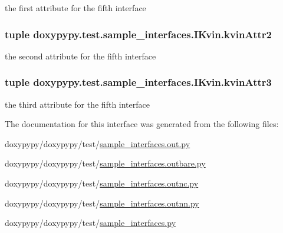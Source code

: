the first attribute for the fifth interface 

\hypertarget{classdoxypypy_1_1test_1_1sample__interfaces_1_1_i_kvin_ad630f62663e004b6abe8cb0e1ed1f73e}{
\subsubsection[{kvin\-Attr2}]{\setlength{\rightskip}{0pt plus 5cm}tuple doxypypy.\-test.\-sample\-\_\-interfaces.\-I\-Kvin.\-kvin\-Attr2\hspace{0.3cm}{\ttfamily [static]}}}\label{classdoxypypy_1_1test_1_1sample__interfaces_1_1_i_kvin_ad630f62663e004b6abe8cb0e1ed1f73e}


the second attribute for the fifth interface 

\hypertarget{classdoxypypy_1_1test_1_1sample__interfaces_1_1_i_kvin_ab17bfed438dd820f0216b1c29d717fc3}{
\subsubsection[{kvin\-Attr3}]{\setlength{\rightskip}{0pt plus 5cm}tuple doxypypy.\-test.\-sample\-\_\-interfaces.\-I\-Kvin.\-kvin\-Attr3\hspace{0.3cm}{\ttfamily [static]}}}\label{classdoxypypy_1_1test_1_1sample__interfaces_1_1_i_kvin_ab17bfed438dd820f0216b1c29d717fc3}


the third attribute for the fifth interface 



The documentation for this interface was generated from the following files\-:\begin{DoxyCompactItemize}
\item 
doxypypy/doxypypy/test/\hyperlink{sample__interfaces_8out_8py}{sample\-\_\-interfaces.\-out.\-py}\item 
doxypypy/doxypypy/test/\hyperlink{sample__interfaces_8outbare_8py}{sample\-\_\-interfaces.\-outbare.\-py}\item 
doxypypy/doxypypy/test/\hyperlink{sample__interfaces_8outnc_8py}{sample\-\_\-interfaces.\-outnc.\-py}\item 
doxypypy/doxypypy/test/\hyperlink{sample__interfaces_8outnn_8py}{sample\-\_\-interfaces.\-outnn.\-py}\item 
doxypypy/doxypypy/test/\hyperlink{sample__interfaces_8py}{sample\-\_\-interfaces.\-py}\end{DoxyCompactItemize}
